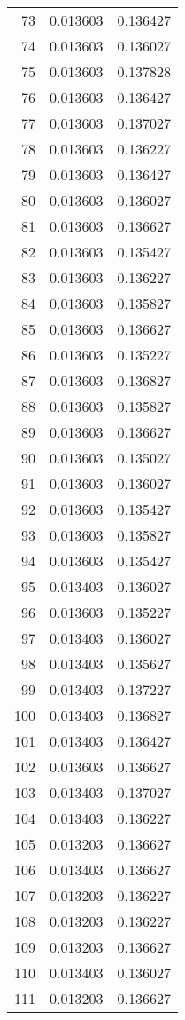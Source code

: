 \begin{longtable}{rrr}
73 & 0.013603 & 0.136427 \\
74 & 0.013603 & 0.136027 \\
75 & 0.013603 & 0.137828 \\
76 & 0.013603 & 0.136427 \\
77 & 0.013603 & 0.137027 \\
78 & 0.013603 & 0.136227 \\
79 & 0.013603 & 0.136427 \\
80 & 0.013603 & 0.136027 \\
81 & 0.013603 & 0.136627 \\
82 & 0.013603 & 0.135427 \\
83 & 0.013603 & 0.136227 \\
84 & 0.013603 & 0.135827 \\
85 & 0.013603 & 0.136627 \\
86 & 0.013603 & 0.135227 \\
87 & 0.013603 & 0.136827 \\
88 & 0.013603 & 0.135827 \\
89 & 0.013603 & 0.136627 \\
90 & 0.013603 & 0.135027 \\
91 & 0.013603 & 0.136027 \\
92 & 0.013603 & 0.135427 \\
93 & 0.013603 & 0.135827 \\
94 & 0.013603 & 0.135427 \\
95 & 0.013403 & 0.136027 \\
96 & 0.013603 & 0.135227 \\
97 & 0.013403 & 0.136027 \\
98 & 0.013403 & 0.135627 \\
99 & 0.013403 & 0.137227 \\
100 & 0.013403 & 0.136827 \\
101 & 0.013403 & 0.136427 \\
102 & 0.013603 & 0.136627 \\
103 & 0.013403 & 0.137027 \\
104 & 0.013403 & 0.136227 \\
105 & 0.013203 & 0.136627 \\
106 & 0.013403 & 0.136627 \\
107 & 0.013203 & 0.136227 \\
108 & 0.013203 & 0.136227 \\
109 & 0.013203 & 0.136627 \\
110 & 0.013403 & 0.136027 \\
111 & 0.013203 & 0.136627 \\

\end{longtable}
